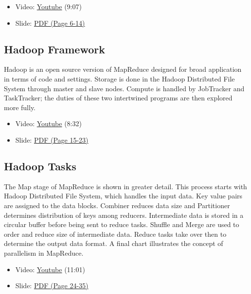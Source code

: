 \begin{itemize}
\tightlist
\item
  Video: \href{https://www.youtube.com/watch?v=sSIGaDaulvA}{Youtube}
  (9:07)
\item
  Slide:
  \href{https://drive.google.com/open?id=0B88HKpainTSfMnpCelpNQUpNdVE}{PDF
  (Page 6-14)}
\end{itemize}

\subsection{Hadoop Framework}\label{hadoop-framework}

Hadoop is an open source version of MapReduce designed for broad
application in terms of code and settings. Storage is done in the Hadoop
Distributed File System through master and slave nodes. Compute is
handled by JobTracker and TaskTracker; the duties of these two
intertwined programs are then explored more fully.

\begin{itemize}
\tightlist
\item
  Video: \href{https://www.youtube.com/watch?v=Vuroqly6FTE}{Youtube}
  (8:32)
\item
  Slide:
  \href{https://drive.google.com/open?id=0B88HKpainTSfMnpCelpNQUpNdVE}{PDF
  (Page 15-23)}
\end{itemize}

\subsection{Hadoop Tasks}\label{hadoop-tasks}

The Map stage of MapReduce is shown in greater detail. This process
starts with Hadoop Distributed File System, which handles the input
data. Key value pairs are assigned to the data blocks. Combiner reduces
data size and Partitioner determines distribution of keys among
reducers. Intermediate data is stored in a circular buffer before being
sent to reduce tasks. Shuffle and Merge are used to order and reduce
size of intermediate data. Reduce tasks take over then to determine the
output data format. A final chart illustrates the concept of parallelism
in MapReduce.

\begin{itemize}
\tightlist
\item
  Video: \href{https://www.youtube.com/watch?v=UN4t3tvdjms}{Youtube}
  (11:01)
\item
  Slide:
  \href{https://drive.google.com/open?id=0B88HKpainTSfMnpCelpNQUpNdVE}{PDF
  (Page 24-35)}
\end{itemize}

